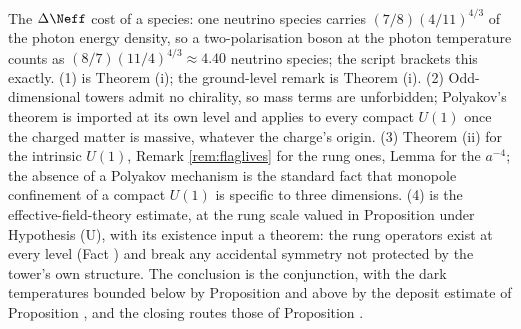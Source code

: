 The $\Delta\Neff$ cost of a species: one neutrino species carries $(7/8)(4/11)^{4/3}$ of the photon energy density, so a two-polarisation boson at the photon temperature counts as $(8/7)(11/4)^{4/3} \approx 4.40$ neutrino species; the script brackets this exactly. (1) is Theorem (i); the ground-level remark is Theorem (i). (2) Odd-dimensional towers admit no chirality, so mass terms are unforbidden; Polyakov's theorem is imported at its own level and applies to every compact $U(1)$ once the charged matter is massive, whatever the charge's origin. (3) Theorem (ii) for the intrinsic $U(1)$, Remark \ref{rem:flaglives} for the rung ones, Lemma  for the $a^{-4}$; the absence of a Polyakov mechanism is the standard fact that monopole confinement of a compact $U(1)$ is specific to three dimensions. (4) is the effective-field-theory estimate, at the rung scale valued in Proposition  under Hypothesis (U), with its existence input a theorem: the rung operators exist at every level (Fact ) and break any accidental symmetry not protected by the tower's own structure. The conclusion is the conjunction, with the dark temperatures bounded below by Proposition  and above by the deposit estimate of Proposition , and the closing routes those of Proposition .
